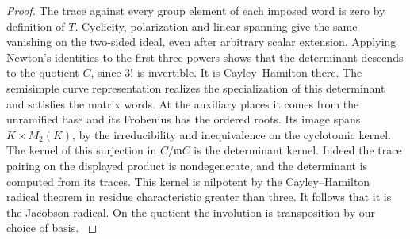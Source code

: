\documentclass[a4paper,11pt]{article}
\theoremstyle{definition}
\theoremstyle{remark}
\numberwithin{equation}{section}
\begin{document}
\begin{proof}
The trace against every group element of each imposed word
is zero by definition of \(T\). Cyclicity, polarization and
linear spanning give the same vanishing on the two-sided
ideal, even after arbitrary scalar extension. Applying
Newton's identities to the first three powers shows that
the determinant descends to the quotient \(C\), since
\(3!\) is invertible. It is Cayley--Hamilton there. The
semisimple curve representation realizes the specialization
of this determinant and satisfies the matrix words. At
the auxiliary places it comes from the unramified base
and its Frobenius has the ordered roots. Its image spans
\(K\times M_2(K)\), by the irreducibility and inequivalence
on the cyclotomic kernel. The kernel of this surjection in
\(C/\mathfrak m C\) is the determinant kernel. Indeed the
trace pairing on the displayed product is nondegenerate,
and the determinant is computed from its traces. This
kernel is nilpotent by the Cayley--Hamilton radical theorem
in residue characteristic greater than three. It follows
that it is the Jacobson radical. On the quotient the
involution is transposition by our choice of basis.
\cite{VIII-VI-chenevier364}
\end{proof}
\end{document}
